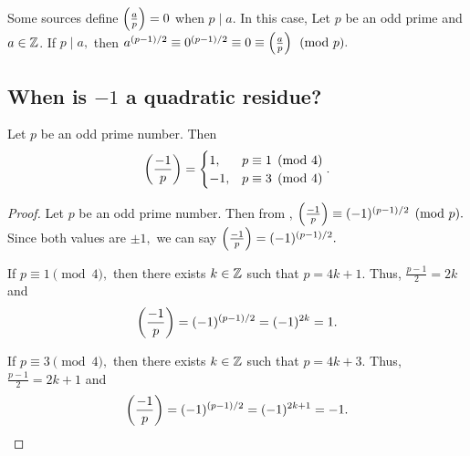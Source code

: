 \documentclass{../ximera}
\begin{document}
\begin{remark}
	Some sources define $\left(\frac{a}{p}\right)=0$ when $p\mid a.$ In this case,  Let $p$ be an odd prime and $a\in\mathbb Z$.
	If $p\mid a,$ then $a^{(p-1)/2}\equiv 0^{(p-1)/2}\equiv 0\equiv\left(\frac{a}{p}\right)\pmod{p}.$
\end{remark}

\subsection{When is $-1$ a quadratic residue?}

\begin{thm*}[Theorem 4.6]\label{thm:residue-neg1}
	Let $p$ be an odd prime number. Then 
	\[
		\left(\frac{-1}{p}\right)=
			\begin{cases}
 				1, & p\equiv 1\pmod{4}\\
				-1, & p\equiv 3\pmod{4}
			\end{cases}.
	\]
\end{thm*}

\begin{proof}
	Let $p$ be an odd prime number. Then from , $\left(\frac{-1}{p}\right)\equiv (-1)^{(p-1)/2}\pmod{p}.$ Since both values are $\pm1,$ we can say $\left(\frac{-1}{p}\right)=(-1)^{(p-1)/2}.$

	If $p\equiv 1\pmod{4},$ then there exists $k\in\mathbb Z$ such that $p=4k+1.$ Thus, $\frac{p-1}{2}=2k$ and 
		\[
			\left(\frac{-1}{p}\right)=(-1)^{(p-1)/2}=(-1)^{2k}=1.
		\]
	
	If $p\equiv 3\pmod{4},$ then there exists $k\in\mathbb Z$ such that $p=4k+3.$ Thus, $\frac{p-1}{2}=2k+1$ and 
		\[
			\left(\frac{-1}{p}\right)=(-1)^{(p-1)/2}=(-1)^{2k+1}=-1.
		\]
\end{proof}
\end{document}
